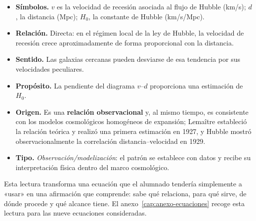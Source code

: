 \begin{itemize}
  \item \textbf{Símbolos.} $v$ es la velocidad de recesión asociada al flujo de Hubble (km/s); $d$, la distancia (Mpc); $H_{0}$, la constante de Hubble (km/s/Mpc).
  \item \textbf{Relación.} Directa: en el régimen local de la ley de Hubble, la velocidad de recesión crece aproximadamente de forma proporcional con la distancia.
  \item \textbf{Sentido.} Las galaxias cercanas pueden desviarse de esa tendencia por sus velocidades peculiares.
  \item \textbf{Propósito.} La pendiente del diagrama $v$--$d$ proporciona una estimación de $H_{0}$.
  \item \textbf{Origen.} Es una \textbf{relación observacional} y, al mismo tiempo, es consistente con los modelos cosmológicos homogéneos de expansión; Lemaître estableció la relación teórica y realizó una primera estimación en 1927, y Hubble mostró observacionalmente la correlación distancia--velocidad en 1929.
  \item \textbf{Tipo.} \emph{Observación/modelización}: el patrón se establece con datos y recibe su interpretación física dentro del marco cosmológico.
\end{itemize}

Esta lectura transforma una ecuación que el alumnado tendería simplemente a «usar» en una afirmación que comprende: sabe qué relaciona, para qué sirve, de dónde procede y qué alcance tiene. El anexo~\ref{cap:anexo-ecuaciones} recoge esta lectura para las nueve ecuaciones consideradas.
